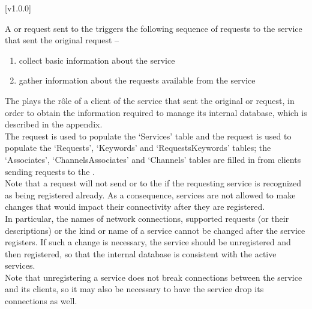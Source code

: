 [v1.0.0]
%

A  or
 request sent to the
 triggers the following sequence of
requests to the service that sent the original request --
\begin{enumerate}
\item \textbf{} collect basic information about the
service
\item \textbf{} gather information about the requests
available from the service
\end{enumerate}
The  plays the r\^ole of a client of the
service that sent the original 
or  request, in order to obtain the
information required to manage its internal database, which is described in the
 appendix.\\

The  request is used to populate the `Services' table
and the  request is used to populate the `Requests',
`Keywords' and `RequestsKeywords' tables; the `Associates', `ChannelsAssociates' and
`Channels' tables are filled in from clients sending 
 requests to the
.\\

Note that a  request will not
send  or  to the
 if the requesting service is recognized
as being registered already.
As a consequence, services are not allowed to make changes that would impact their
connectivity after they are registered.\\

In particular, the names of \yarp{} network connections, supported requests (or their
descriptions) or the kind or name of a service cannot be changed after the service
registers.
If such a change is necessary, the service should be unregistered and then registered, so
that the internal database is consistent with the active services.\\

Note that unregistering a service does not break connections between the service and its
clients, so it may also be necessary to have the service drop its connections as well.
\appendixEnd{}
